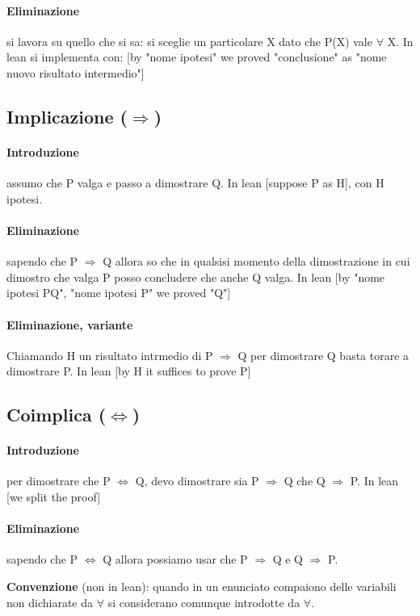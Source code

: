 \documentclass{article}
\begin{document}
\paragraph{Eliminazione} si lavora su quello che si sa: si sceglie un particolare X dato che P(X) vale $\forall$ X. In lean si implementa con: [by "nome ipotesi" we proved "conclusione" as "nome nuovo risultato intermedio"]

\subsection{Implicazione ($\Rightarrow$)}
\paragraph{Introduzione} assumo che P valga e passo a dimostrare Q. In lean [suppose P as H], con H ipotesi.
\paragraph{Eliminazione} sapendo che P $\Rightarrow$ Q allora so che in qualsisi momento della dimostrazione in cui dimostro che valga P posso concludere che anche Q valga. In lean [by "nome ipotesi PQ", "nome ipotesi P" we proved "Q"]
\paragraph{Eliminazione, variante} Chiamando H un risultato intrmedio di P $\Rightarrow$ Q per dimostrare Q basta torare a dimostrare P. In lean [by H it suffices to prove P]
\subsection{Coimplica ($\Leftrightarrow$)} 

\paragraph{Introduzione} per dimostrare che P $\Leftrightarrow$ Q, devo dimostrare sia P $\Rightarrow$ Q che Q $\Rightarrow$ P. In lean [we split the proof]
\paragraph{Eliminazione} sapendo che P $\Leftrightarrow$ Q allora possiamo usar che P $\Rightarrow$ Q e Q $\Rightarrow$ P.



\textbf{Convenzione} (non in lean):  quando in un enunciato compaiono delle variabili non dichiarate da $\forall$ si considerano comunque introdotte da $\forall$.
\end{document}
